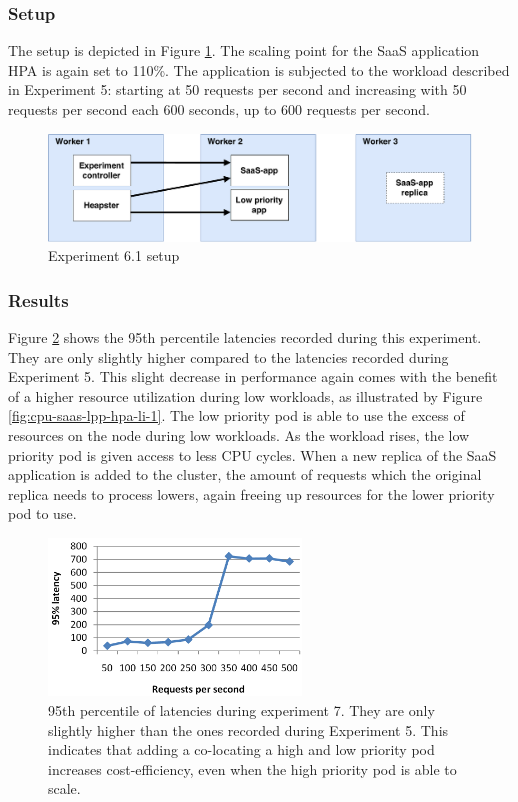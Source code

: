 \subsubsection{Setup}
The setup is depicted in Figure \ref{fig:experiment6}. The scaling point for the SaaS application HPA is again set to 110\%. The application is subjected to the workload described in Experiment 5: starting at 50 requests per second and increasing with 50 requests per second each 600 seconds, up to 600 requests per second.

\setlength\abovecaptionskip{3pt}
\begin{figure}[H]
\centering
\includegraphics[width=\textwidth]{Images/Experiments/Experiment_4_SaaS.pdf}
\caption{Experiment 6.1 setup}
\label{fig:experiment6}
\end{figure}

\subsubsection{Results}
Figure \ref{fig:lat-saas-lpp-hpa-li} shows the 95th percentile latencies recorded during this experiment. They are only slightly higher compared to the latencies recorded during Experiment 5. This slight decrease in performance again comes with the benefit of a higher resource utilization during low workloads, as illustrated by Figure \ref{fig:cpu-saas-lpp-hpa-li-1}. The low priority pod is able to use the excess of resources on the node during low workloads. As the workload rises, the low priority pod is given access to less CPU cycles. When a new replica of the SaaS application is added to the cluster, the amount of requests which the original replica needs to process lowers, again freeing up resources for the lower priority pod to use. 

\setlength\abovecaptionskip{3pt}
\begin{figure}[h]
\centering
\includegraphics[width=0.60\textwidth]{Images/Experiments/CPU/Latencies/lat-saas-lpp-hpa-li.PNG}
\caption{95th percentile of latencies during experiment 7. They are only slightly higher than the ones recorded during Experiment 5. This indicates that adding a co-locating a high and low priority pod increases cost-efficiency, even when the high priority pod is able to scale.}
\label{fig:lat-saas-lpp-hpa-li}
\end{figure}


